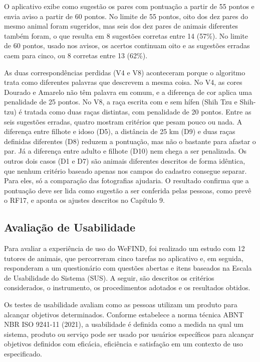 O aplicativo exibe como sugestão os pares com pontuação a partir de 55 pontos e envia aviso a partir de 60 pontos. No limite de 55 pontos, oito dos dez pares do mesmo animal foram sugeridos, mas seis dos dez pares de animais diferentes também foram, o que resulta em 8 sugestões corretas entre 14 (57\%). No limite de 60 pontos, usado nos avisos, os acertos continuam oito e as sugestões erradas caem para cinco, ou 8 corretas entre 13 (62\%).

As duas correspondências perdidas (V4 e V8) aconteceram porque o algoritmo trata como diferentes palavras que descrevem a mesma coisa. No V4, as cores Dourado e Amarelo não têm palavra em comum, e a diferença de cor aplica uma penalidade de 25 pontos. No V8, a raça escrita com e sem hífen (Shih Tzu e Shih-tzu) é tratada como duas raças distintas, com penalidade de 20 pontos. Entre as seis sugestões erradas, quatro mostram critérios que pesam pouco ou nada. A diferença entre filhote e idoso (D5), a distância de 25 km (D9) e duas raças definidas diferentes (D8) reduzem a pontuação, mas não o bastante para afastar o par. Já a diferença entre adulto e filhote (D10) nem chega a ser penalizada. Os outros dois casos (D1 e D7) são animais diferentes descritos de forma idêntica, que nenhum critério baseado apenas nos campos do cadastro consegue separar. Para eles, só a comparação das fotografias ajudaria. O resultado confirma que a pontuação deve ser lida como sugestão a ser conferida pelas pessoas, como prevê o RF17, e aponta os ajustes descritos no Capítulo 9.

\subsection{Avaliação de Usabilidade}

Para avaliar a experiência de uso do WeFIND, foi realizado um estudo com 12 tutores de animais, que percorreram cinco tarefas no aplicativo e, em seguida, responderam a um questionário com questões abertas e itens baseados na Escala de Usabilidade do Sistema (SUS). A seguir, são descritos os critérios considerados, o instrumento, os procedimentos adotados e os resultados obtidos.

Os testes de usabilidade avaliam como as pessoas utilizam um produto para alcançar objetivos determinados. Conforme estabelece a norma técnica ABNT NBR ISO 9241-11 (2021), a usabilidade é definida como a medida na qual um sistema, produto ou serviço pode ser usado por usuários específicos para alcançar objetivos definidos com eficácia, eficiência e satisfação em um contexto de uso especificado.


